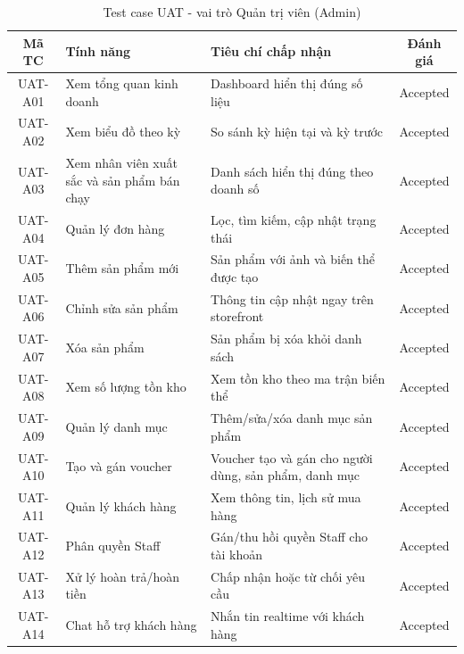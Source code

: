 \begin{table}[H]
  \centering
  \renewcommand{\arraystretch}{1.3}
  \begin{tabular}{|c|p{3.5cm}|p{4.8cm}|c|}
    \hline
    \textbf{Mã TC} & \textbf{Tính năng}                          & \textbf{Tiêu chí chấp nhận}                           & \textbf{Đánh giá} \\
    \hline
    UAT-A01        & Xem tổng quan kinh doanh                    & Dashboard hiển thị đúng số liệu                       & Accepted          \\
    \hline
    UAT-A02        & Xem biểu đồ theo kỳ                         & So sánh kỳ hiện tại và kỳ trước                       & Accepted          \\
    \hline
    UAT-A03        & Xem nhân viên xuất sắc và sản phẩm bán chạy & Danh sách hiển thị đúng theo doanh số                 & Accepted          \\
    \hline
    UAT-A04        & Quản lý đơn hàng                            & Lọc, tìm kiếm, cập nhật trạng thái                    & Accepted          \\
    \hline
    UAT-A05        & Thêm sản phẩm mới                           & Sản phẩm với ảnh và biến thể được tạo                 & Accepted          \\
    \hline
    UAT-A06        & Chỉnh sửa sản phẩm                          & Thông tin cập nhật ngay trên storefront               & Accepted          \\
    \hline
    UAT-A07        & Xóa sản phẩm                                & Sản phẩm bị xóa khỏi danh sách                        & Accepted          \\
    \hline
    UAT-A08        & Xem số lượng tồn kho                        & Xem tồn kho theo ma trận biến thể                     & Accepted          \\
    \hline
    UAT-A09        & Quản lý danh mục                            & Thêm/sửa/xóa danh mục sản phẩm                        & Accepted          \\
    \hline
    UAT-A10        & Tạo và gán voucher                          & Voucher tạo và gán cho người dùng, sản phẩm, danh mục & Accepted          \\
    \hline
    UAT-A11        & Quản lý khách hàng                          & Xem thông tin, lịch sử mua hàng                       & Accepted          \\
    \hline
    UAT-A12        & Phân quyền Staff                            & Gán/thu hồi quyền Staff cho tài khoản                 & Accepted          \\
    \hline
    UAT-A13        & Xử lý hoàn trả/hoàn tiền                    & Chấp nhận hoặc từ chối yêu cầu                        & Accepted          \\
    \hline
    UAT-A14        & Chat hỗ trợ khách hàng                      & Nhắn tin realtime với khách hàng                      & Accepted          \\
    \hline
  \end{tabular}
  \caption{Test case UAT - vai trò Quản trị viên (Admin)}
\end{table}

